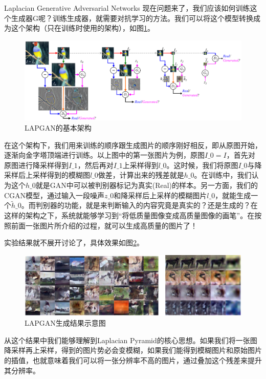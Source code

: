\documentclass{ctexart}
\begin{document}
\begin{section}{Laplacian Generative Adversarial Networks}
		现在问题来了，我们应该如何训练这个生成器G呢？训练生成器，就需要对抗学习的方法。我们可以将这个模型转换成为这个架构（只在训练时使用的架构），如图\ref{fig:lapgan-structure}。
		
		\begin{figure}
			\centering
			\includegraphics[width=40em]{figures/LAPGAN-general-structure.png}
			\caption{LAPGAN的基本架构}
			\label{fig:lapgan-structure}
		\end{figure}
	
		在这个架构下，我们用来训练的顺序跟生成图片的顺序刚好相反，即从原图开始，逐渐向金字塔顶端进行训练。以上图中的第一张图片为例，原图$I\_0=I$，首先对原图进行降采样得到$I\_1$，然后再对$I\_1$上采样得到$l\_0$。这时候，我们将原图$I\_0$与降采样后上采样得到的模糊图$l\_0$做差，计算出来的残差就是$h\_0$。在训练中，我们认为这个$h\_0$就是GAN中可以被判别器标记为真实(Real)的样本。另一方面，我们的CGAN模型，通过输入一段噪声$z\_0$和降采样后上采样的模糊图片$l\_0$，就能生成一个$\tilde{h}\_0$。而判别器的功能，就是来判断输入的内容究竟是真实的？还是生成的？在这样的架构之下，系统就能够学习到“将低质量图像变成高质量图像的画笔”。在按照前面一张图片所介绍的过程，就可以生成高质量的图片了！
		
		实验结果就不展开讨论了，具体效果如图\ref{fig:lapgan-result}。
		
		\begin{figure}
			\centering
			\includegraphics[width=45em]{figures/LAPGAN-experiment.png}
			\caption{LAPGAN生成结果示意图}
			\label{fig:lapgan-result}
		\end{figure}
	
		从这个结果中我们能够理解到Laplacian Pyramid的核心思想。如果我们将一张图降采样再上采样，得到的图片势必会变模糊，如果我们能得到模糊图片和原始图片的插值，也就意味着我们可以将一张分辨率不高的图片，通过叠加这个残差来提升其分辨率。
		

\end{section}
\end{document}
